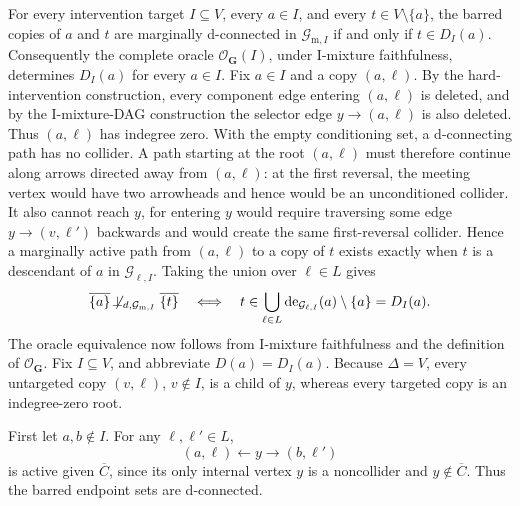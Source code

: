 For every intervention target \(I\subseteq V\), every \(a\in I\), and every \(t\in V\setminus\{a\}\), the barred copies of \(a\) and \(t\) are marginally d-connected in \(\mathcal G_{\mathrm m,I}\) if and only if \(t\in D_I(a)\). Consequently the complete oracle \(\mathcal O_{\mathbf G}(I)\), under I-mixture faithfulness, determines \(D_I(a)\) for every \(a\in I\).
Fix \(a\in I\) and a copy \((a,\ell)\). By the hard-intervention construction, every component edge entering \((a,\ell)\) is deleted, and by the I-mixture-DAG construction the selector edge \(y\to(a,\ell)\) is also deleted. Thus \((a,\ell)\) has indegree zero. With the empty conditioning set, a d-connecting path has no collider. A path starting at the root \((a,\ell)\) must therefore continue along arrows directed away from \((a,\ell)\): at the first reversal, the meeting vertex would have two arrowheads and hence would be an unconditioned collider. It also cannot reach \(y\), for entering \(y\) would require traversing some edge \(y\to(v,\ell')\) backwards and would create the same first-reversal collider. Hence a marginally active path from \((a,\ell)\) to a copy of \(t\) exists exactly when \(t\) is a descendant of \(a\) in \(\mathcal G_{\ell,I}\). Taking the union over \(\ell\in L\) gives
\[
 \overline{\{a\}}\not\!\perp_{d,\mathcal G_{\mathrm m,I}}\overline{\{t\}}
 \quad\Longleftrightarrow\quad
 t\in\bigcup_{\ell\in L}\operatorname{de}_{\mathcal G_{\ell,I}}(a)\setminus\{a\}
 =D_I(a).
\]
The oracle equivalence now follows from I-mixture faithfulness and the definition of \(\mathcal O_{\mathbf G}\).
Fix \(I\subseteq V\), and abbreviate \(D(a)=D_I(a)\). Because \(\Delta=V\), every untargeted copy \((v,\ell)\), \(v\notin I\), is a child of \(y\), whereas every targeted copy is an indegree-zero root.

First let \(a,b\notin I\). For any \(\ell,\ell'\in L\),
\[
 (a,\ell)\leftarrow y\to(b,\ell')
\]
is active given \(\overline C\), since its only internal vertex \(y\) is a noncollider and \(y\notin\overline C\). Thus the barred endpoint sets are d-connected.

